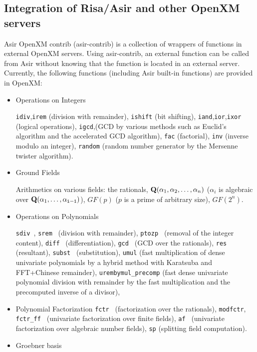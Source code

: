 \documentclass[12pt]{article}
\begin{document}
\subsection{Integration of Risa/Asir and other OpenXM servers}

Asir OpenXM contrib (asir-contrib) is a collection of wrappers of
functions in external OpenXM servers. Using asir-contrib,
an external function can be called 
from Asir without knowing that the function is located in
an external server. Currently, the following functions (including
Asir built-in functions) are provided
in OpenXM:

\begin{itemize}
\item Operations on Integers

{\tt idiv},{\tt irem} (division with remainder),
{\tt ishift} (bit shifting),
{\tt iand},{\tt ior},{\tt ixor} (logical operations),
{\tt igcd},(GCD by various methods such as Euclid's algorithm and
the accelerated GCD algorithm),
{\tt fac} (factorial),
{\tt inv} (inverse modulo an integer),
{\tt random} (random number generator by the Mersenne twister algorithm).

\item Ground Fields

Arithmetics on various fields: the rationals,
${\bf Q}(\alpha_1,\alpha_2,\ldots,\alpha_n)$
($\alpha_i$ is algebraic over ${\bf Q}(\alpha_1,\ldots,\alpha_{\tt i-1})$),
$GF(p)$ ($p$ is a prime of arbitrary size), $GF(2^n)$.

\item Operations on Polynomials

{\tt sdiv }, {\tt srem } (division with remainder),
{\tt ptozp } (removal of the integer content),
{\tt diff } (differentiation),
{\tt gcd } (GCD over the rationals),
{\tt res } (resultant),
{\tt subst } (substitution),
{\tt umul} (fast multiplication of dense univariate polynomials
by a hybrid method with Karatsuba and FFT+Chinese remainder),
{\tt urembymul\_precomp} (fast dense univariate polynomial
division with remainder by the fast multiplication and
the precomputed inverse of a divisor),

\item Polynomial Factorization
{\tt fctr } (factorization over the rationals),
{\tt modfctr}, {\tt fctr\_ff } (univariate factorization over finite fields),
{\tt af } (univariate factorization over algebraic number fields),
{\tt sp} (splitting field computation).

\item Groebner basis


\end{itemize}
\end{document}
